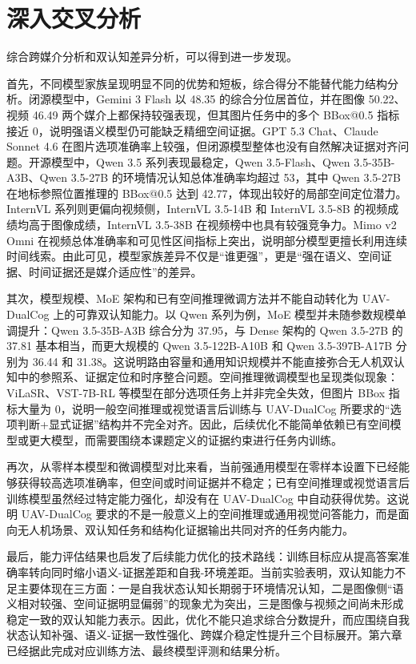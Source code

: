 \FloatBarrier
\section{深入交叉分析}

综合跨媒介分析和双认知差异分析，可以得到进一步发现。

首先，不同模型家族呈现明显不同的优势和短板，综合得分不能替代能力结构分析。闭源模型中，Gemini 3 Flash 以 48.35 的综合分位居首位，并在图像 50.22、视频 46.49 两个媒介上都保持较强表现，但其图片任务中的多个 BBox@0.5 指标接近 0，说明强语义模型仍可能缺乏精细空间证据。GPT 5.3 Chat、Claude Sonnet 4.6 在图片选项准确率上较强，但闭源模型整体也没有自然解决证据对齐问题。开源模型中，Qwen 3.5 系列表现最稳定，Qwen 3.5-Flash、Qwen 3.5-35B-A3B、Qwen 3.5-27B 的环境情况认知总体准确率均超过 53，其中 Qwen 3.5-27B 在地标参照位置推理的 BBox@0.5 达到 42.77，体现出较好的局部空间定位潜力。InternVL 系列则更偏向视频侧，InternVL 3.5-14B 和 InternVL 3.5-8B 的视频成绩均高于图像成绩，InternVL 3.5-38B 在视频榜中也具有较强竞争力。Mimo v2 Omni 在视频总体准确率和可见性区间指标上突出，说明部分模型更擅长利用连续时间线索。由此可见，模型家族差异不仅是“谁更强”，更是“强在语义、空间证据、时间证据还是媒介适应性”的差异。

其次，模型规模、MoE 架构和已有空间推理微调方法并不能自动转化为 UAV-DualCog 上的可靠双认知能力。以 Qwen 系列为例，MoE 模型并未随参数规模单调提升：Qwen 3.5-35B-A3B 综合分为 37.95，与 Dense 架构的 Qwen 3.5-27B 的 37.81 基本相当，而更大规模的 Qwen 3.5-122B-A10B 和 Qwen 3.5-397B-A17B 分别为 36.44 和 31.38。这说明路由容量和通用知识规模并不能直接弥合无人机双认知中的参照系、证据定位和时序整合问题。空间推理微调模型也呈现类似现象：ViLaSR、VST-7B-RL 等模型在部分选项任务上并非完全失效，但图片 BBox 指标大量为 0，说明一般空间推理或视觉语言后训练与 UAV-DualCog 所要求的“选项判断+显式证据”结构并不完全对齐。因此，后续优化不能简单依赖已有空间模型或更大模型，而需要围绕本课题定义的证据约束进行任务内训练。

再次，从零样本模型和微调模型对比来看，当前强通用模型在零样本设置下已经能够获得较高选项准确率，但空间或时间证据并不稳定；已有空间推理或视觉语言后训练模型虽然经过特定能力强化，却没有在 UAV-DualCog 中自动获得优势。这说明 UAV-DualCog 要求的不是一般意义上的空间推理或通用视觉问答能力，而是面向无人机场景、双认知任务和结构化证据输出共同对齐的任务内能力。

最后，能力评估结果也启发了后续能力优化的技术路线：训练目标应从提高答案准确率转向同时缩小语义-证据差距和自我-环境差距。当前实验表明，双认知能力不足主要体现在三方面：一是自我状态认知长期弱于环境情况认知，二是图像侧“语义相对较强、空间证据明显偏弱”的现象尤为突出，三是图像与视频之间尚未形成稳定一致的双认知能力表示。因此，优化不能只追求综合分数提升，而应围绕自我状态认知补强、语义-证据一致性强化、跨媒介稳定性提升三个目标展开。第六章已经据此完成对应训练方法、最终模型评测和结果分析。

